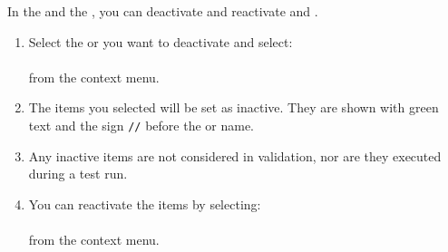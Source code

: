 In the \gdtestcaseeditor{} and the \gdtestsuiteeditor{}, you can deactivate and reactivate \gdcases{} and \gdsteps{}. 

\begin{enumerate}
\item Select the \gdsteps{} or \gdcases{} you want to deactivate and select:\\
\\
from the context menu.
\item The items you selected will be set as inactive. They are shown with green text and the sign \verb+//+ before the \gdcase{} or \gdstep{} name.
\item Any inactive items are not considered in \gdsuite{} validation, nor are they executed during a test run. 
\item You can reactivate the items by selecting:\\
\\
from the context menu.
\end{enumerate}
